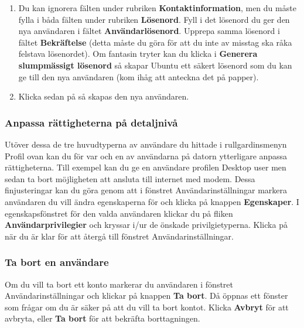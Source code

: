 \documentclass[a4paper,final]{memoir} %
\begin{document}
\begin{enumerate}
\begin{itemize}
\end{itemize}

\item Du kan ignorera fälten under rubriken \textbf{Kontaktinformation}, men du måste fylla i båda fälten under rubriken \textbf{Lösenord}. Fyll i det lösenord du ger den nya användaren i fältet \textbf{Användarlösenord}. Upprepa samma lösenord i fältet \textbf{Bekräftelse} (detta måste du göra för att du inte av misstag ska råka felstava lösenordet). Om fantasin tryter kan du klicka i \textbf{Generera slumpmässigt lösenord} så skapar Ubuntu ett säkert lösenord som du kan ge till den nya användaren (kom ihåg att anteckna det på papper).

\item Klicka sedan på \xok{} så skapas den nya användaren.
 
\end{enumerate}


\subsubsection{Anpassa rättigheterna på detaljnivå}

Utöver dessa de tre huvudtyperna av användare du hittade i rullgardinsmenyn Profil ovan kan du för var och en av användarna på datorn ytterligare anpassa rättigheterna. Till exempel kan du ge en användare profilen Desktop user men sedan ta bort möjligheten att ansluta till internet med modem. Dessa finjusteringar kan du göra genom att i fönstret Användarinställningar markera användaren du vill ändra egenskaperna för och klicka på knappen \textbf{Egenskaper}. I egenskapsfönstret för den valda användaren klickar du på fliken \textbf{Användarprivilegier} och kryssar i/ur de önskade privilgietyperna. Klicka på \xok{} när du är klar för att återgå till fönstret Användarinställningar.

\subsubsection{Ta bort en användare}


Om du vill ta bort ett konto markerar du användaren i fönstret Användarinställningar och klickar på knappen \textbf{Ta bort}. Då öppnas ett fönster som frågar om du är säker på att du vill ta bort kontot. Klicka \textbf{Avbryt} för att avbryta, eller \textbf{Ta bort} för att bekräfta borttagningen.
\end{document}
